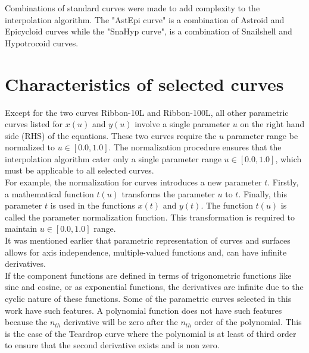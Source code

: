 Combinations of standard curves were made to add complexity to the interpolation algorithm. The "AstEpi curve" is a combination of Astroid and Epicycloid curves while the "SnaHyp curve", is a combination of Snailshell and Hypotrocoid curves.
 

\section{Characteristics of selected curves}

Except for the two curves Ribbon-10L and Ribbon-100L, all other parametric curves listed for $x(u)$ and $y(u)$ involve a single parameter $u$ on the right hand side (RHS) of the equations. These two curves require the $u$ parameter range be normalized to $u  \in  [0.0, 1.0]$. The normalization procedure ensures that the interpolation algorithm cater only a single parameter range $u  \in  [0.0, 1.0]$, which must be applicable to all selected curves.\\

For example, the normalization for curves introduces a new parameter $t$. Firstly, a mathematical function $t(u)$ transforms the parameter $u$ to $t$. Finally, this parameter $t$ is used in the functions $x(t)$ and $y(t)$. The function $t(u)$ is called the parameter normalization function. This transformation is required to maintain $u \in [0.0, 1.0]$ range.\\   

It was mentioned earlier that parametric representation of curves and surfaces allows for axis independence, multiple-valued functions and, can have infinite derivatives. \\

If the component functions are defined in terms of trigonometric functions like sine and cosine, or as exponential functions, the derivatives are infinite due to the cyclic nature of these functions. Some of the parametric curves selected in this work have such features. A polynomial function does not have such features because the $n_{th}$ derivative will be zero after the $n_{th}$ order of the polynomial. This is the case of the Teardrop curve where the polynomial is at least of third order to ensure that the second derivative exists and is non zero.

 


